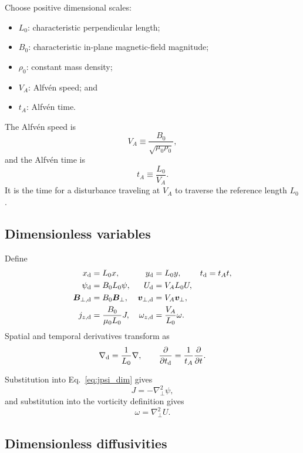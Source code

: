\documentclass[11pt]{article}
\newcommand{\vect}[1]{\bm{#1}}
\newcommand{\Lap}{\nabla_{\!\perp}^{2}}
\begin{document}
Choose positive dimensional scales:
\begin{itemize}
  \item $L_0$: characteristic perpendicular length;
  \item $B_0$: characteristic in-plane magnetic-field magnitude;
  \item $\rho_0$: constant mass density;
  \item $V_A$: Alfv\'en speed; and
  \item $t_A$: Alfv\'en time.
\end{itemize}
The Alfv\'en speed is
\begin{equation}
V_A\equiv\frac{B_0}{\sqrt{\mu_0\rho_0}},
\label{eq:alfvenspeed}
\end{equation}
and the Alfv\'en time is
\begin{equation}
t_A\equiv\frac{L_0}{V_A}.
\label{eq:alfventime}
\end{equation}
It is the time for a disturbance traveling at $V_A$ to traverse the reference length $L_0$.

\subsection{Dimensionless variables}

Define
\begin{align}
x_{\rm d}&=L_0x,&y_{\rm d}&=L_0y,&t_{\rm d}&=t_At,\\
\psi_{\rm d}&=B_0L_0\psi,&
U_{\rm d}&=V_AL_0U,\\
\vect{B}_{\perp,\rm d}&=B_0\vect{B}_\perp,&
\vect{v}_{\perp,\rm d}&=V_A\vect{v}_\perp,\\
j_{z,\rm d}&=\frac{B_0}{\mu_0L_0}J,&
\omega_{z,\rm d}&=\frac{V_A}{L_0}\omega.
\end{align}
Spatial and temporal derivatives transform as
\begin{equation}
\nabla_{\rm d}=\frac{1}{L_0}\nabla,
\qquad
\frac{\partial}{\partial t_{\rm d}}
=\frac{1}{t_A}\frac{\partial}{\partial t}.
\end{equation}

Substitution into Eq.~\eqref{eq:jpsi_dim} gives
\begin{equation}
J=-\Lap\psi,
\end{equation}
and substitution into the vorticity definition gives
\begin{equation}
\omega=\Lap U.
\end{equation}

\subsection{Dimensionless diffusivities}
\end{document}
